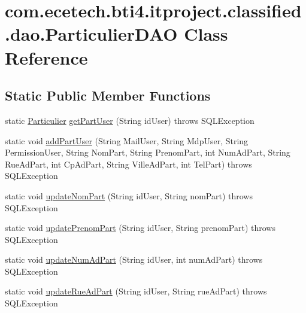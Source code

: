 \hypertarget{classcom_1_1ecetech_1_1bti4_1_1itproject_1_1classified_1_1dao_1_1_particulier_d_a_o}{}\section{com.\+ecetech.\+bti4.\+itproject.\+classified.\+dao.\+Particulier\+D\+AO Class Reference}
\label{classcom_1_1ecetech_1_1bti4_1_1itproject_1_1classified_1_1dao_1_1_particulier_d_a_o}
\subsection*{Static Public Member Functions}
\begin{DoxyCompactItemize}
\item 
static \hyperlink{classcom_1_1ecetech_1_1bti4_1_1itproject_1_1classified_1_1beans_1_1_particulier}{Particulier} \hyperlink{classcom_1_1ecetech_1_1bti4_1_1itproject_1_1classified_1_1dao_1_1_particulier_d_a_o_ac0301dfbee89d579eda92e8bce0b3adc}{get\+Part\+User} (String id\+User)  throws S\+Q\+L\+Exception 
\item 
static void \hyperlink{classcom_1_1ecetech_1_1bti4_1_1itproject_1_1classified_1_1dao_1_1_particulier_d_a_o_a6ae4d4a053c195c408910fb795e1d075}{add\+Part\+User} (String Mail\+User, String Mdp\+User, String Permission\+User, String Nom\+Part, String Prenom\+Part, int Num\+Ad\+Part, String Rue\+Ad\+Part, int Cp\+Ad\+Part, String Ville\+Ad\+Part, int Tel\+Part)  throws S\+Q\+L\+Exception 
\item 
static void \hyperlink{classcom_1_1ecetech_1_1bti4_1_1itproject_1_1classified_1_1dao_1_1_particulier_d_a_o_a98be8767197256f613505cc57f63e17e}{update\+Nom\+Part} (String id\+User, String nom\+Part)  throws S\+Q\+L\+Exception 
\item 
static void \hyperlink{classcom_1_1ecetech_1_1bti4_1_1itproject_1_1classified_1_1dao_1_1_particulier_d_a_o_a254445b06718d384521fdb9579ceeffe}{update\+Prenom\+Part} (String id\+User, String prenom\+Part)  throws S\+Q\+L\+Exception 
\item 
static void \hyperlink{classcom_1_1ecetech_1_1bti4_1_1itproject_1_1classified_1_1dao_1_1_particulier_d_a_o_acedb245e7cae04b12565c22e959f27cf}{update\+Num\+Ad\+Part} (String id\+User, int num\+Ad\+Part)  throws S\+Q\+L\+Exception 
\item 
static void \hyperlink{classcom_1_1ecetech_1_1bti4_1_1itproject_1_1classified_1_1dao_1_1_particulier_d_a_o_a7e2a2890658c990d31f9df3d75ca0b4e}{update\+Rue\+Ad\+Part} (String id\+User, String rue\+Ad\+Part)  throws S\+Q\+L\+Exception 

\end{DoxyCompactItemize}
